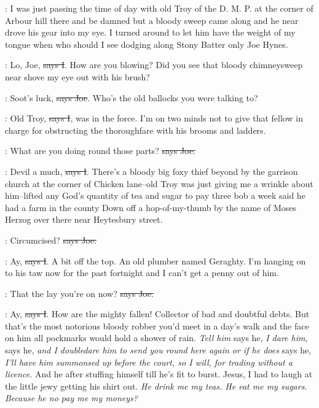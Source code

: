 \Nq:
I was just passing the time of day with old Troy of the D. M. P. at the
corner of Arbour hill there and be damned but a bloody sweep came along
and he near drove his gear into my eye. I turned around to let him have
the weight of my tongue when who should I see dodging along Stony Batter
only Joe Hynes.

:
Lo, Joe, \sout{says I}. How are you blowing? Did you see that bloody
chimneysweep near shove my eye out with his brush?

\joe:
Soot's luck, \sout{says Joe}.
Who's the old ballocks you were talking to?

:
Old Troy, \sout{says I}, was in the force.
I'm on two minds not to give that
fellow in charge for obstructing the thoroughfare with his brooms and
ladders.

\joe:
What are you doing round those parts? \sout{says Joe.}

:
Devil a much, \sout{says I}.
There's a bloody big foxy thief beyond by the
garrison church at the corner of Chicken lane--old Troy was just giving
me a wrinkle about him--lifted any God's quantity of tea and sugar to pay
three bob a week said he had a farm in the county Down off a
hop-of-my-thumb by the name of Moses Herzog over there near Heytesbury
street.

\joe:
Circumcised? \sout{says Joe.}

:
Ay, \sout{says I}.
A bit off the top. An old plumber named Geraghty. I'm
hanging on to his taw now for the past fortnight and I can't get a penny
out of him.

\joe:
That the lay you're on now? \sout{says Joe.}

:
Ay, \sout{says I}.
How are the mighty fallen! Collector of bad and doubtful
debts. But that's the most notorious bloody robber you'd meet in a day's
walk and the face on him all pockmarks would hold a shower of rain. \emph{Tell
him} says he, \emph{I dare him}, says he, \emph{and I doubledare him to send you round
here again or if he does} says he, \emph{I'll have him summonsed up before the
court, so I will, for trading without a licence.} And he after stuffing
himself till he's fit to burst. Jesus, I had to laugh at the little jewy
getting his shirt out. \emph{He drink me my teas. He eat me my sugars. Because
he no pay me my moneys?}

